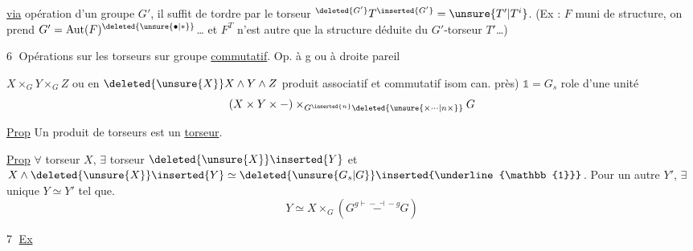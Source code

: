 \uline{via} opération d'un groupe $G'$, il suffit de tordre par le torseur ${}^{\deleted{G'}}T^{\inserted{G'}}=\unsure{T'|T^i}$. (Ex :  $F$ muni de  structure,  on prend $G'=\operatorname{Aut}(F)^{\deleted{\unsure{\bullet|\ast}}}$\ldots{} et $F^T$ n'est autre  que la structure déduite du $G'$-torseur $T'$\ldots)

\textcircled{6} Opérations  sur les torseurs sur groupe \uline{commutatif}. Op. à g ou à droite pareil

$X\times_G Y\times_G Z$ ou en $\deleted{\unsure{X}}X\wedge Y\wedge Z$ produit associatif et commutatif  isom can. près) $\mathbb{1}=G_s$  role d'une unité
\[
 (X\times Y\times-)\times_{G^{\inserted{n}}\deleted{\unsure{\times\cdots|n\times}}}G
\]

\uline{Prop} Un produit de torseurs est un \uline{torseur}.


\uline{Prop} $\forall$ torseur $X$, $\exists$ torseur $\deleted{\unsure{X}}\inserted{Y}$ et  $X\wedge\deleted{\unsure{X}}\inserted{Y}\simeq\deleted{\unsure{G_s|G}}\inserted{\underline{\mathbb{1}}}$. Pour un autre $Y'$, $\exists$  unique $Y\simeq Y'$ tel que.
\[
 Y\simeq X\times_G(G\overset{g\mathrel{\vdash\!-\!\dashv}-g}{\mathrel{-}}G)
\]

\textcircled{7} \uline{Ex}  


